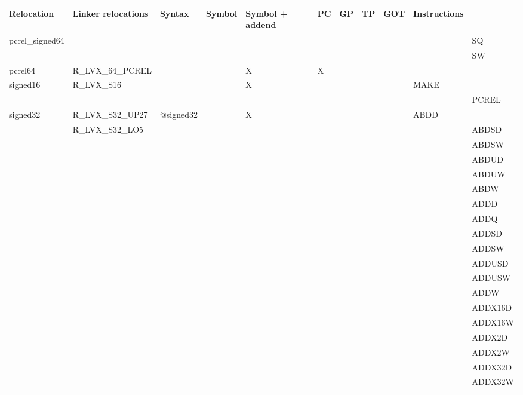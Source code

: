{\tiny
\begin{tabular}{|l|l|l|l|l|l|l|l|l|l|l|} \hline
\textsf{Relocation} & \textsf{Linker relocations} & \textsf{Syntax} & \textsf{Symbol} & \textsf{Symbol + addend} & \textsf{PC} & \textsf{GP} & \textsf{TP} & \textsf{GOT} & \textsf{Instructions} \\
\hline
\textsf{pcrel\_signed64} & & & & & & & & & & \textsf{SQ} \\
 & & & & & & & & & & \textsf{SW} \\
\hline
\textsf{pcrel64} & \textsf{R\_LVX\_64\_PCREL} & \textsf{} & \textsf{} & \textsf{X} & \textsf{X} & \textsf{} & \textsf{} & \textsf{} & \textsf{} \\
\hline
\textsf{signed16} & \textsf{R\_LVX\_S16} & \textsf{} & \textsf{} & \textsf{X} & \textsf{} & \textsf{} & \textsf{} & \textsf{} & \textsf{MAKE} \\
 & & & & & & & & & & \textsf{PCREL} \\
\hline
\textsf{signed32} & \textsf{R\_LVX\_S32\_UP27} & \textsf{@signed32} & \textsf{} & \textsf{X} & \textsf{} & \textsf{} & \textsf{} & \textsf{} & \textsf{ABDD} \\
 & \textsf{R\_LVX\_S32\_LO5} & & & & & & & & & \textsf{ABDSD} \\
 & & & & & & & & & & \textsf{ABDSW} \\
 & & & & & & & & & & \textsf{ABDUD} \\
 & & & & & & & & & & \textsf{ABDUW} \\
 & & & & & & & & & & \textsf{ABDW} \\
 & & & & & & & & & & \textsf{ADDD} \\
 & & & & & & & & & & \textsf{ADDQ} \\
 & & & & & & & & & & \textsf{ADDSD} \\
 & & & & & & & & & & \textsf{ADDSW} \\
 & & & & & & & & & & \textsf{ADDUSD} \\
 & & & & & & & & & & \textsf{ADDUSW} \\
 & & & & & & & & & & \textsf{ADDW} \\
 & & & & & & & & & & \textsf{ADDX16D} \\
 & & & & & & & & & & \textsf{ADDX16W} \\
 & & & & & & & & & & \textsf{ADDX2D} \\
 & & & & & & & & & & \textsf{ADDX2W} \\
 & & & & & & & & & & \textsf{ADDX32D} \\
 & & & & & & & & & & \textsf{ADDX32W} \\

\end{tabular}}
